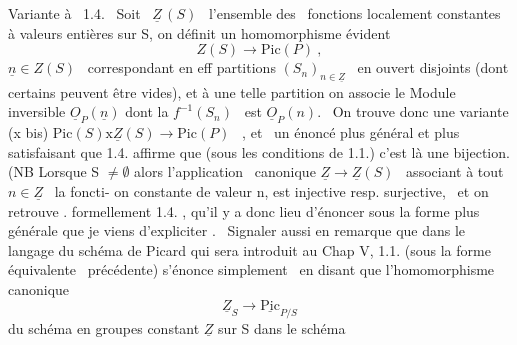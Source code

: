Variante à \ 1.4. \ Soit \ $\underline{Z}\,(S)$ \ l'ensemble des \ fonctions localement
constantes à valeurs entières sur S, on définit un homomorphisme évident
\[ Z(S) \longrightarrow \mathrm{Pic}(P) \ , \]
  $\underline{n} \in Z(S)$ \ correspondant en eff   partitions $(S_n)_{n\in\underline{Z}}$ \ en ouvert
disjoints (dont certains peuvent être vides),  et  à une
telle partition on associe le Module inversible $\underline{O}_P(\underline{n})$ dont la  
$f^{-1}(S_n)$ \ est $\underline{O}_P(n)$. \ On trouve donc une variante
(x bis) \hfill $\mathrm{Pic}(S)\mathrm{x}\underline{Z}(S) \longrightarrow \mathrm{Pic}(P)$ \ , \hfill
et \ un énoncé plus général et plus satisfaisant que 1.4. affirme que
(sous les conditions de 1.1.) c'est là une bijection. (NB Lorsque S $\neq \emptyset$
\hand{)}
alors l'application \ canonique $\underline{Z} \to \underline{Z}(S)$ \ associant à tout $n \in \underline{Z}$ \ la foncti-%
on constante de valeur n, est injective resp. surjective, \ et on retrouve .
formellement 1.4. , qu'il y a donc lieu d'énoncer sous la forme plus
générale que je viens d'expliciter . \ Signaler aussi en remarque que
dans le langage du schéma de Picard qui sera introduit au Chap V, 1.1.
(sous la forme équivalente \ précédente) s'énonce simplement \ en disant que
l'homomorphisme canonique
\[ \underline{Z}_S \longrightarrow \underline{\mathrm{Pic}}_{P/S} \]
du schéma en groupes constant  $\underline{Z}$ sur S dans le schéma


